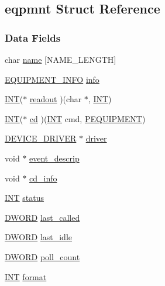 \subsection{eqpmnt Struct Reference}
\label{structeqpmnt}
\subsubsection*{Data Fields}
\begin{DoxyCompactItemize}
\item 
char \hyperlink{structeqpmnt_a80db04cadcc657d17e5ba6f742d6fbc6}{name} \mbox{[}NAME\_\-LENGTH\mbox{]}
\item 
\hyperlink{structEQUIPMENT__INFO}{EQUIPMENT\_\-INFO} \hyperlink{structeqpmnt_a51afc5b1fc5a6a107cffb9542444b188}{info}
\item 
\hyperlink{vppg_8h_a392e62da233ed3e2f7c3fd4f487a3896}{INT}($\ast$ \hyperlink{structeqpmnt_ab7d302c46bbcfe6151e17bac90451ee3}{readout} )(char $\ast$, \hyperlink{vppg_8h_a392e62da233ed3e2f7c3fd4f487a3896}{INT})
\item 
\hyperlink{vppg_8h_a392e62da233ed3e2f7c3fd4f487a3896}{INT}($\ast$ \hyperlink{structeqpmnt_ae263c2d6a07b0aeb17b85ee3ea042220}{cd} )(\hyperlink{vppg_8h_a392e62da233ed3e2f7c3fd4f487a3896}{INT} cmd, \hyperlink{structeqpmnt}{PEQUIPMENT})
\item 
\hyperlink{structDEVICE__DRIVER}{DEVICE\_\-DRIVER} $\ast$ \hyperlink{structeqpmnt_af19c464fc7092048c9418328ca4e4afc}{driver}
\item 
void $\ast$ \hyperlink{structeqpmnt_a4cb2c750babcb1eb077ec8151097d0eb}{event\_\-descrip}
\item 
void $\ast$ \hyperlink{structeqpmnt_ac88537c1672f32d13a99ce6822fc4d46}{cd\_\-info}
\item 
\hyperlink{vppg_8h_a392e62da233ed3e2f7c3fd4f487a3896}{INT} \hyperlink{structeqpmnt_af498c07c0758b46649715eead4627874}{status}
\item 
\hyperlink{vt2_8h_a798af1e30bc65f319c1a246cecf59e39}{DWORD} \hyperlink{structeqpmnt_a6bbbd3b1eb8ab1bbc62aa6e07571866a}{last\_\-called}
\item 
\hyperlink{vt2_8h_a798af1e30bc65f319c1a246cecf59e39}{DWORD} \hyperlink{structeqpmnt_a8261688ef7d0d371cdf50023cf0447c1}{last\_\-idle}
\item 
\hyperlink{vt2_8h_a798af1e30bc65f319c1a246cecf59e39}{DWORD} \hyperlink{structeqpmnt_ae9bf94db8ff48533601c3833b1b20097}{poll\_\-count}
\item 
\hyperlink{vppg_8h_a392e62da233ed3e2f7c3fd4f487a3896}{INT} \hyperlink{structeqpmnt_acad980d7699722234c72bfca6243203b}{format}

\end{DoxyCompactItemize}
